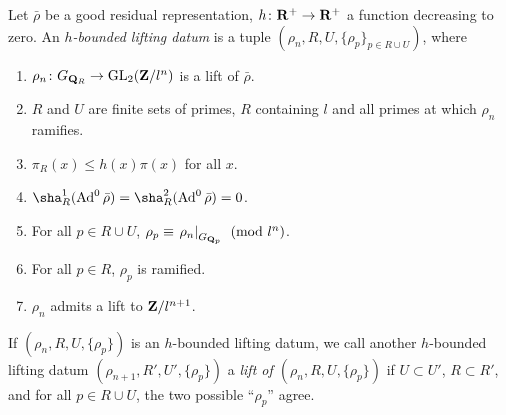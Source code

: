 \begin{definition}
Let $\bar\rho$ be a good residual representation, $h\colon \mathbf{R}^+ \to \mathbf{R}^+$ a 
function decreasing to zero. An \emph{$h$-bounded lifting datum} is a tuple 
$(\rho_n,R,U,\{\rho_p\}_{p\in R\cup U})$, where 
\begin{enumerate}
\item
$\rho_n\colon G_{\mathbf{Q}_R} \to \operatorname{GL}_2(\mathbf{Z}/l^n)$ is a lift of $\bar\rho$.

\item
$R$ and $U$ are finite sets of primes, $R$ containing $l$ and all primes at 
which $\rho_n$ ramifies. 

\item
$\pi_R(x)\leqslant h(x)\pi(x)$ for all $x$. 

\item
$\sha_R^1(\Ad^0\bar\rho) = \sha_R^2(\Ad^0\bar\rho) = 0$. 

\item
For all $p\in R\cup U$, 
$\rho_p\equiv \left. \rho_n\right|_{G_{\mathbf{Q}_p}}\pmod{l^n}$. 

\item
For all $p\in R$, $\rho_p$ is ramified. 

\item
$\rho_n$ admits a lift to $\mathbf{Z}/l^{n+1}$. 
\end{enumerate}
\end{definition}

If $(\rho_n,R,U,\{\rho_p\})$ is an $h$-bounded lifting datum, we call 
another $h$-bounded lifting datum $(\rho_{n+1},R',U',\{\rho_p\})$ a \emph{lift 
of $(\rho_n,R,U,\{\rho_p\})$} if $U\subset U'$, $R\subset R'$, and for all 
$p\in R\cup U$, the two possible ``$\rho_p$'' agree. 

